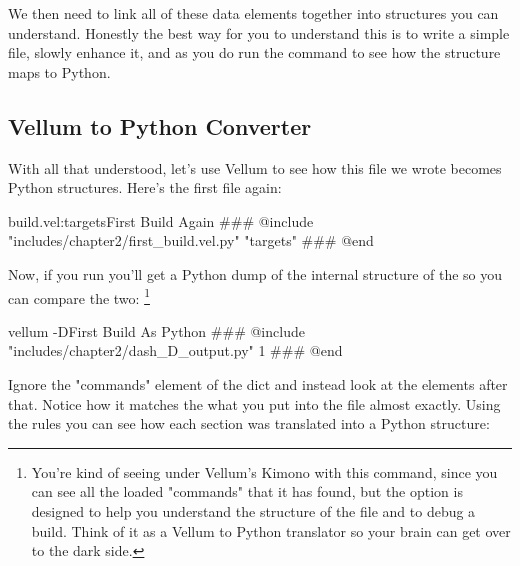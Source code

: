 We then need to link all of these data elements together into structures you can
understand.  Honestly the best way for you to understand this is to write a
simple  file, slowly enhance it, and as you do run the
 command to see how the structure maps to Python.

\subsection{Vellum to Python Converter}

With all that understood, let's use Vellum to see how this file we wrote becomes
Python structures.  Here's the first  file again:

\begin{code}{build.vel:targets}{First Build Again}
### @include "includes/chapter2/first_build.vel.py" "targets"
### @end
\end{code}

Now, if you run  you'll get a Python dump of the internal
structure of the  so you can compare the two:
\footnote{You're kind of seeing under Vellum's Kimono with this command, since you can see
all the loaded "commands" that it has found, but the  option is
designed to help you understand the structure of the file and to debug a build.
Think of it as a Vellum to Python translator so your brain can get over to the
dark side.}

\begin{code}{vellum -D}{First Build As Python}
### @include "includes/chapter2/dash_D_output.py" 1
### @end
\end{code}

Ignore the "commands" element of the dict and instead look at the elements after
that.  Notice how it matches the what you put into the  file
almost exactly.  Using the rules you can see how each section was translated
into a Python structure:

